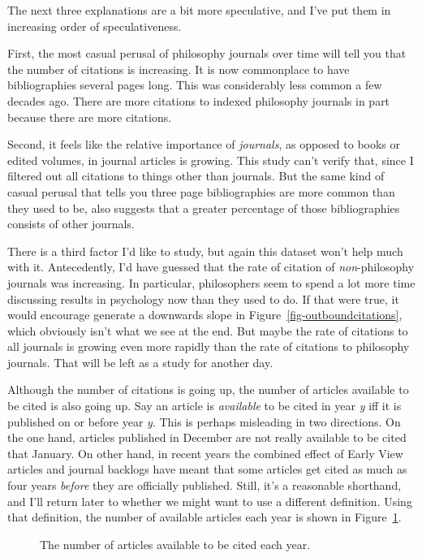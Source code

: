\documentclass[
  11pt,
  letterpaper,
  DIV=11,
  numbers=noendperiod,
  twoside]{scrartcl}
\makeatletter
\newcommand*\pandocbounded[1]{%
  \sbox\pandoc@box{#1}%
  \Gscale@div\@tempa{\textheight}{\dimexpr\ht\pandoc@box+\dp\pandoc@box\relax}%
  \Gscale@div\@tempb{\linewidth}{\wd\pandoc@box}%
  \ifdim\@tempb\p@<\@tempa\p@\let\@tempa\@tempb\fi%
  \ifdim\@tempa\p@<\p@\scalebox{\@tempa}{\usebox\pandoc@box}%
  \else\usebox{\pandoc@box}%
  \fi%
}
\makeatother
\begin{document}
The next three explanations are a bit more speculative, and I've put
them in increasing order of speculativeness.

First, the most casual perusal of philosophy journals over time will
tell you that the number of citations is increasing. It is now
commonplace to have bibliographies several pages long. This was
considerably less common a few decades ago. There are more citations to
indexed philosophy journals in part because there are more citations.

Second, it feels like the relative importance of \emph{journals}, as
opposed to books or edited volumes, in journal articles is growing. This
study can't verify that, since I filtered out all citations to things
other than journals. But the same kind of casual perusal that tells you
three page bibliographies are more common than they used to be, also
suggests that a greater percentage of those bibliographies consists of
other journals.

There is a third factor I'd like to study, but again this dataset won't
help much with it. Antecedently, I'd have guessed that the rate of
citation of \emph{non}-philosophy journals was increasing. In
particular, philosophers seem to spend a lot more time discussing
results in psychology now than they used to do. If that were true, it
would encourage generate a downwards slope in
Figure~\ref{fig-outboundcitations}, which obviously isn't what we see at
the end. But maybe the rate of citations to all journals is growing even
more rapidly than the rate of citations to philosophy journals. That
will be left as a study for another day.

Although the number of citations is going up, the number of articles
available to be cited is also going up. Say an article is
\emph{available} to be cited in year \emph{y} iff it is published on or
before year \emph{y}. This is perhaps misleading in two directions. On
the one hand, articles published in December are not really available to
be cited that January. On other hand, in recent years the combined
effect of Early View articles and journal backlogs have meant that some
articles get cited as much as four years \emph{before} they are
officially published. Still, it's a reasonable shorthand, and I'll
return later to whether we might want to use a different definition.
Using that definition, the number of available articles each year is
shown in Figure~\ref{fig-availablearticles}.

\begin{figure}

\centering{

\pandocbounded{\texttt{[image: apc\_files/figure-pdf/fig-availablearticles-1.pdf]}}

}

\caption{\label{fig-availablearticles}The number of articles available
to be cited each year.}

\end{figure}%
\end{document}
